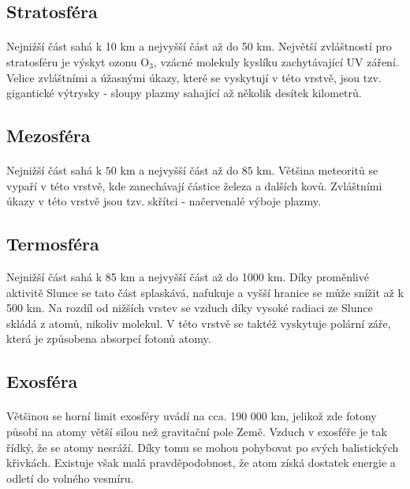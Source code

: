 \documentclass[11pt]{article}
\begin{document}
%
\subsection*{Stratosféra}
\paragraph{}
Nejnižší část sahá k 10 km a nejvyšší část až do 50 km. Největší zvláštností pro stratosféru je výskyt ozonu $\textrm{O}_3$, vzácné molekuly kyslíku zachytávající UV záření. Velice zvláštními a úžasnými úkazy, které se vyskytují v této vrstvě, jsou tzv. gigantické výtrysky - sloupy plazmy sahající až několik desítek kilometrů.
%
\subsection*{Mezosféra}
\paragraph{} Nejnižší část sahá k $50$ km a nejvyšší část až do $85$ km. Většina meteoritů se vypaří v této vrstvě, kde zanechávají částice železa a dalších kovů. Zvláštními úkazy v této vrstvě jsou tzv. skřítci - načervenalé výboje plazmy.
%
\subsection*{Termosféra}
\par Nejnižší část sahá k 85 km a nejvyšší část až do 1000 km. Díky proměnlivé aktivitě Slunce se tato část splaskává, nafukuje a vyšší hranice se může snížit až k 500 km. Na rozdíl od nižších vrstev se vzduch díky vysoké radiaci ze Slunce skládá z atomů, nikoliv molekul. V této vrstvě se taktéž vyskytuje polární záře, která je způsobena absorpcí fotonů atomy.
%
\subsection*{Exosféra}
\paragraph{} Většinou se horní limit exosféry uvádí na cca. 190 000 km, jelikož zde fotony působí na atomy větší silou než gravitační pole Země. Vzduch v exosféře je tak řídký, že se atomy nesráží. Díky tomu se mohou pohybovat po svých balistických křivkách. Existuje však malá pravděpodobnost, že atom získá dostatek energie a odletí do volného vesmíru.
%
\newpage
%
\end{document}
